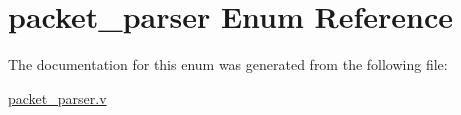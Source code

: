 \hypertarget{enumpacket__parser}{}\section{packet\+\_\+parser Enum Reference}
\label{enumpacket__parser}


The documentation for this enum was generated from the following file\+:\begin{DoxyCompactItemize}
\item 
\mbox{\hyperlink{packet__parser_8v}{packet\+\_\+parser.\+v}}\end{DoxyCompactItemize}

